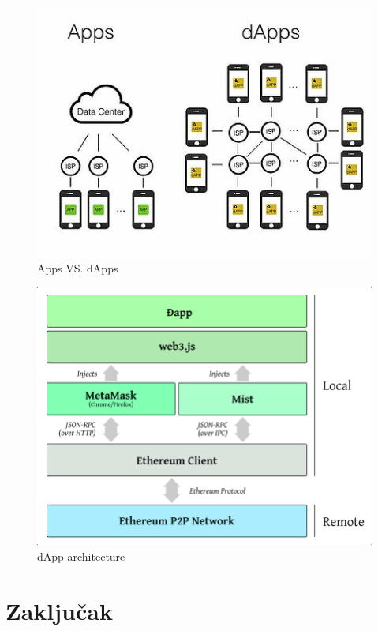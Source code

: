\documentclass[12pt]{report}
\begin{document}
\begin{figure}[h]
\centering
\includegraphics[scale=0.55]{AppsVSdApps}
\caption{Apps VS. dApps}
\label{fig:appvsdapp}
\end{figure}

\begin{figure}[h]
\centering
\includegraphics[scale=0.4]{dapp-architecture}
\caption{dApp architecture}
\label{fig:dapp}
\end{figure}

\chapter{Zaključak}

\printbibliography
\end{document}

